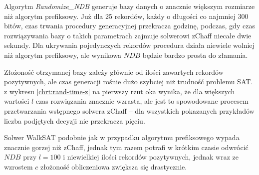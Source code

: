 Algorytm \textit{Randomize\_NDB} generuje bazy danych o znacznie większym rozmiarze niż algorytm prefiksowy. Już dla 25 rekordów, każdy o długości co najmniej 300 bitów, czas trwania procedury generacyjnej przekracza godzinę,
podczas, gdy czas rozwiązywania bazy o takich parametrach zajmuje solwerowi zChaff niecałe dwie sekundy. Dla ukrywania pojedynczych rekordów procedura działa niewiele wolniej niż algorytm prefiksowy, ale wynikowa $NDB$ będzie bardzo prosta do złamania.

Złożoność otrzymanej bazy zależy głównie od ilości zawartych rekordów pozytywnych, ale czas generacji rośnie dużo szybciej niż trudność problemu SAT. z wykresu \ref{chrt:rand-time-z} na pierwszy rzut oka wynika, że dla większych wartości $l$ czas rozwiązania znacznie wzrasta, ale jest to spowodowane
procesem przetwarzania wstępnego solwera zChaff -- dla wszystkich pokazanych przykładów liczba podjętych decyzji nie przekracza pięciu.

Solwer WalkSAT podobnie jak w przypadku algorytmu prefiksowego wypada znacznie gorzej niż zChaff, jednak tym razem potrafi w krótkim czasie odwrócić $NDB$ przy $l=100$ i niewielkiej ilości rekordów pozytywnych, jednak wraz ze wzrostem $c$ złożoność obliczeniowa zwiększa się drastycznie.

